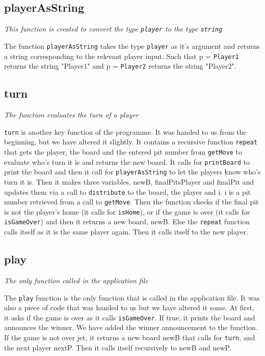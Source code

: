 \documentclass[a4paper]{report}
\begin{document}
\subsection*{playerAsString}
{\it This function is created to convert the type \texttt{player} to the type \texttt{string}}

The function \texttt{playerAsString} takes the type \texttt{player} as it's argument and returns a string corresponding to the relevant player input. Such that p = \texttt{Player1} returns the string "Player1" and p = \texttt{Player2} returns the string "Player2".

\subsection*{turn}
{\it The function evaluates the turn of a player}

\texttt{turn} is another key function of the programme. It was handed  to us from the beginning, but we have altered it slightly. It contains a recursive function \texttt{repeat} that gets the player, the board and the entered 	pit number from \texttt{getMove} to evaluate who's turn it is and returns the new board. It calls for \texttt{printBoard} to print the board and then it call for \texttt{playerAsString} to let the players know who's turn it is.
Then it makes three variables, newB, finalPitsPlayer and finalPit and updates them via a call to \texttt{distribute} to the board, the player and i. i is a pit number retrieved from a call to \texttt{getMove}.
Then the function checks if the final pit is not the player's home (it calls for \texttt{isHome}), or if the game is over (it calls for \texttt{isGameOver}) and then it returns a new board, newB. Else the \texttt{repeat} function calls itself as it is the same player again. Then it calls itself to the new player.

\subsection*{play}
{\it The only function called in the application file}

The \texttt{play} function is the only function that is called in the application file. It was also a piece of code that was handed to us but we have altered it some.
At first, it asks if the game is over as it calls \texttt{isGameOver}. If true, it prints the board and announces the winner. We have added the winner announcement to the function. If the game is not over jet, it returns a new board newB that calls for \texttt{turn}, and the next player nextP. Then it calls itself recursively to newB and newP.
\\
\end{document}
